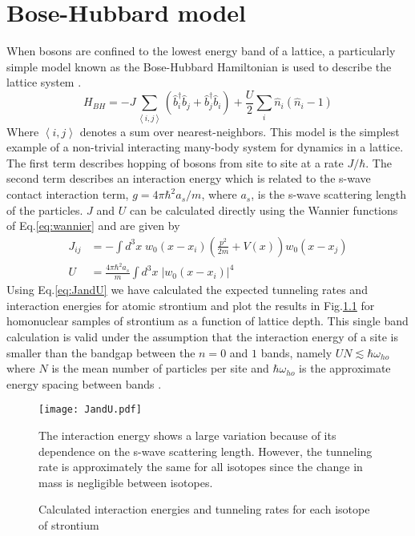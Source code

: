 \chapter{Bose-Hubbard model}
When bosons are confined to the lowest energy band of a lattice, a particularly simple model known as the Bose-Hubbard Hamiltonian is used to describe the lattice system \cite{Jaksch1998}. 
	\begin{equation} \label{eq:boseHubbard}
		 H_{BH} = -J \sum_{\left< i,j \right>} \left(\hat{b}^{\dagger}_i \hat{b}_j + \hat{b}^{\dagger}_j \hat{b}_i \right)
		 		  + \frac{U}{2} \sum_i \hat{n}_i(\hat{n}_i - 1)
	\end{equation}
Where $\left< i,j \right>$ denotes a sum over nearest-neighbors. This model is the simplest example of a non-trivial interacting many-body system for dynamics in a lattice. The first term describes hopping of bosons from site to site at a rate $J/ \hbar$. The second term describes an interaction energy which is related to the s-wave contact interaction term, $g = 4 \pi \hbar^2 a_s/m$, where $a_s$, is the s-wave scattering length of the particles. $J$ and $U$ can be calculated directly using the Wannier functions of Eq.\;\ref{eq:wannier} and are given by \cite{Jaksch2005}
	\begin{equation} \label{eq:JandU}
	\begin{aligned}
		 J_{ij} &= - \int d^3x \; w_0(x-x_i) \left( \frac{p^2}{2m}+V(x) \right) w_0(x-x_j)\\
		 U &= \frac{4 \pi \hbar^2 a_s}{m} \int d^3x \; \left| w_0(x-x_i)\right|^4
	\end{aligned}
	\end{equation}
Using Eq.\;\ref{eq:JandU} we have calculated the expected tunneling rates and interaction energies for atomic strontium and plot the results in Fig.\;\ref{fig:fig_JandU} for homonuclear samples of strontium as a function of lattice depth. This single band calculation is valid under the assumption that the interaction energy of a site is smaller than the bandgap between the $n= 0$ and $1$ bands, namely $U N \lesssim \hbar \omega_{ho}$ where $N$ is the mean number of particles per site and $\hbar \omega_{ho}$ is the approximate energy spacing between bands \cite{Rey2004}. 


\begin{figure} \label{fig:fig_JandU}
	\centerline{
	\texttt{[image: JandU.pdf]}}
	\caption{Calculated interaction energies and tunneling rates for each isotope of strontium}{The interaction energy shows a large variation because of its dependence on the s-wave scattering length. However, the tunneling rate is approximately the same for all isotopes since the change in mass is negligible between isotopes.}
\end{figure}
	
